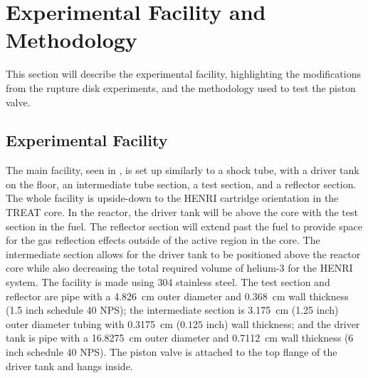 \section{Experimental Facility and Methodology} \label{s:experiment}

This section will describe the experimental facility, highlighting the modifications from the rupture disk experiments, and the methodology used to test the piston valve.



\subsection{Experimental Facility} \label{s:facility}

The main facility, seen in , is set up similarly to a shock tube, with a driver tank on the floor, an intermediate tube section, a test section, and a reflector section. The whole facility is upside-down to the HENRI cartridge orientation in the TREAT core. In the reactor, the driver tank will be above the core with the test section in the fuel. The reflector section will extend past the fuel to provide space for the gas reflection effects outside of the active region in the core. The intermediate section allows for the driver tank to be positioned above the reactor core while also decreasing the total required volume of helium-3 for the HENRI system. The facility is made using 304 stainless steel. The test section and reflector are pipe with a \SI{4.826}{\centi\meter} outer diameter and \SI{0.368}{\centi\meter} wall thickness (1.5 inch schedule 40 NPS); the intermediate section is \SI{3.175}{\centi\meter} (1.25 inch) outer diameter tubing with \SI{0.3175}{\centi\meter} ($0.125$ inch) wall thickness; and the driver tank is pipe with a \SI{16.8275}{\centi\meter} outer diameter and \SI{0.7112}{\centi\meter} wall thickness (6 inch schedule 40 NPS). The piston valve is attached to the top flange of the driver tank and hangs inside.

